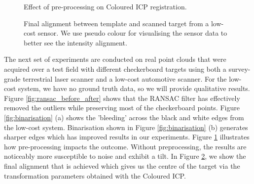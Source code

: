 %






\begin{figure}[h]
    \centering
    \hfill
    \caption{Effect of pre-processing on Coloured ICP registration.}
    \label{fig:pre_processing_effect}
\end{figure}


\begin{figure}[h]
    \centering
    \hfill
    \caption{Final alignment between template and scanned target from a low-cost sensor. We use pseudo colour for visualising the sensor data to better see the intensity alignment. }
    \label{fig:final_alignment_psudo_colour}
\end{figure}


The next set of experiments are conducted on real point clouds that were acquired over a test field with different checkerboard targets using both a survey-grade terrestrial laser scanner and a low-cost automotive scanner. For the low-cost system, we have no ground truth data, so we will provide qualitative results. Figure \ref{fig:ransac_before_after} shows that the RANSAC filter has effectively removed the outliers while preserving most of the checkerboard points. Figure \ref{fig:binarisation} (a) shows the 'bleeding' across the black and white edges from the low-cost system. Binarisation shown in Figure \ref{fig:binarisation} (b) generates sharper edges which has improved results in our experiments. Figure \ref{fig:pre_processing_effect} illustrates how pre-processing impacts the outcome. Without preprocessing, the results are noticeably more susceptible to noise and exhibit a tilt. In  Figure \ref{fig:final_alignment_psudo_colour}, we show the final alignment that is achieved which gives us the centre of the target via the transformation parameters obtained with the Coloured ICP.

